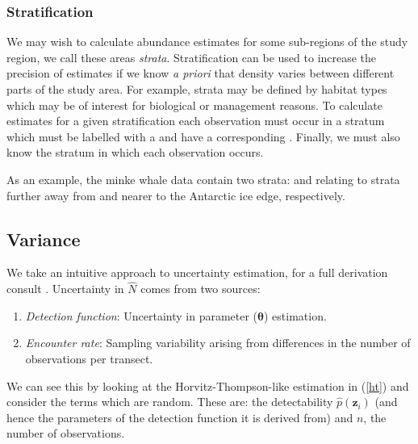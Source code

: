 \documentclass[article]{jss}\usepackage[]{graphicx}\usepackage[]{color}
\begin{document}
\subsubsection{Stratification}

We may wish to calculate abundance estimates for some sub-regions of the study region, we call these areas \textit{strata}. Stratification can be used to increase the precision of estimates if we know \textit{a priori} that density varies between different parts of the study area. For example, strata may be defined by habitat types which may be of interest for biological or management reasons. To calculate estimates for a given stratification each observation must occur in a stratum which must be labelled with a  and have a corresponding . Finally, we must also know the stratum in which each observation occurs.

As an example, the minke whale data contain two strata:  and  relating to strata further away from and nearer to the Antarctic ice edge, respectively.

\subsection{Variance}

We take an intuitive approach to uncertainty estimation, for a full derivation consult \cite{Marques:2003vb}. Uncertainty in $\hat{N}$ comes from two sources:

\begin{enumerate}
\item \textit{Detection function}: Uncertainty in parameter ($\boldsymbol{\theta}$) estimation.
\item \textit{Encounter rate}: Sampling variability arising from differences in the number of observations per transect.
\end{enumerate}

We can see this by looking at the Horvitz-Thompson-like estimation in (\ref{ht}) and consider the terms which are random. These are: the detectability $\hat{p}(\mathbf{z}_i)$ (and hence the parameters of the detection function it is derived from) and $n$, the number of observations.
\end{document}
